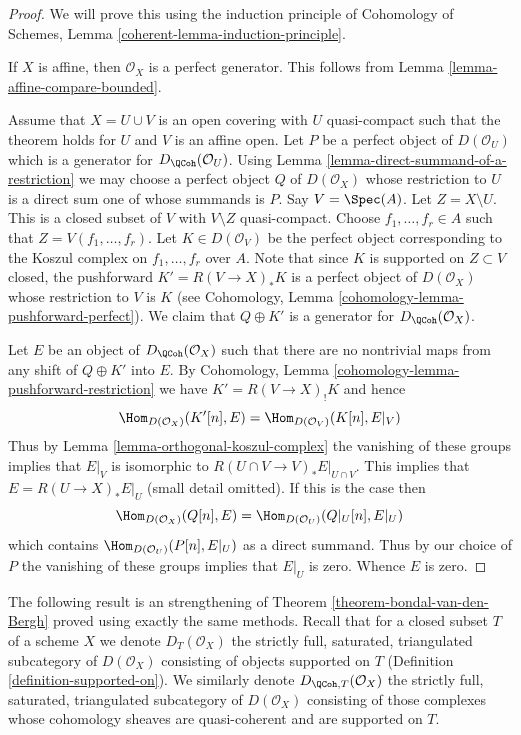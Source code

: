 \begin{proof}
We will prove this using the induction principle of
Cohomology of Schemes, Lemma \ref{coherent-lemma-induction-principle}.

\medskip\noindent
If $X$ is affine, then $\mathcal{O}_X$ is a perfect generator.
This follows from Lemma \ref{lemma-affine-compare-bounded}.

\medskip\noindent
Assume that $X = U \cup V$ is an open covering with $U$ quasi-compact
such that the theorem holds for $U$ and $V$ is an affine open.
Let $P$ be a perfect object of $D(\mathcal{O}_U)$ which is a generator
for $D_\QCoh(\mathcal{O}_U)$. Using
Lemma \ref{lemma-direct-summand-of-a-restriction} we may
choose a perfect object
$Q$ of $D(\mathcal{O}_X)$ whose restriction to $U$ is a direct sum one
of whose summands is $P$. Say $V = \Spec(A)$. Let $Z = X \setminus U$.
This is a closed subset of $V$ with $V \setminus Z$ quasi-compact.
Choose $f_1, \ldots, f_r \in A$ such that
$Z = V(f_1, \ldots, f_r)$. Let $K \in D(\mathcal{O}_V)$ be the perfect
object corresponding to the Koszul complex on $f_1, \ldots, f_r$ over $A$.
Note that since $K$ is supported on $Z \subset V$ closed, the pushforward
$K' = R(V \to X)_*K$ is a perfect object of $D(\mathcal{O}_X)$ whose
restriction to $V$ is $K$ (see
Cohomology, Lemma \ref{cohomology-lemma-pushforward-perfect}).
We claim that $Q \oplus K'$ is a generator for
$D_\QCoh(\mathcal{O}_X)$.

\medskip\noindent
Let $E$ be an object of $D_\QCoh(\mathcal{O}_X)$ such that
there are no nontrivial maps from any shift of $Q \oplus K'$ into $E$.
By Cohomology, Lemma \ref{cohomology-lemma-pushforward-restriction}
we have $K' =  R(V \to X)_! K$ and hence
$$
\Hom_{D(\mathcal{O}_X)}(K'[n], E) = \Hom_{D(\mathcal{O}_V)}(K[n], E|_V)
$$
Thus by Lemma \ref{lemma-orthogonal-koszul-complex} the vanishing of
these groups implies that $E|_V$ is isomorphic to
$R(U \cap V \to V)_*E|_{U \cap V}$. This implies that $E = R(U \to X)_*E|_U$
(small detail omitted). If this is the case then
$$
\Hom_{D(\mathcal{O}_X)}(Q[n], E) = \Hom_{D(\mathcal{O}_U)}(Q|_U[n], E|_U)
$$
which contains $\Hom_{D(\mathcal{O}_U)}(P[n], E|_U)$ as a direct summand.
Thus by our choice of $P$ the vanishing of these groups implies that $E|_U$
is zero. Whence $E$ is zero.
\end{proof}

\noindent
The following result is an strengthening of
Theorem \ref{theorem-bondal-van-den-Bergh}
proved using exactly the same methods.
Recall that for a closed subset $T$ of a scheme $X$ we denote
$D_T(\mathcal{O}_X)$ the strictly full, saturated,
triangulated subcategory of $D(\mathcal{O}_X)$ consisting of objects
supported on $T$ (Definition \ref{definition-supported-on}).
We similarly denote $D_{\QCoh, T}(\mathcal{O}_X)$ the strictly full, saturated,
triangulated subcategory of $D(\mathcal{O}_X)$ consisting of those
complexes whose cohomology sheaves are quasi-coherent and are supported
on $T$.

